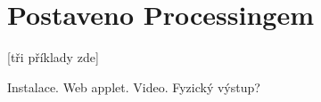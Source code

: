 \documentclass[12pt,twopage]{book}
\newcommand{\oddil}[1]{\section{#1}\label{sec:#1}}
\begin{document}
\chapter{Postaveno Processingem}


[tři příklady zde]

Instalace. Web applet. Video. Fyzický výstup?

\end{document}
